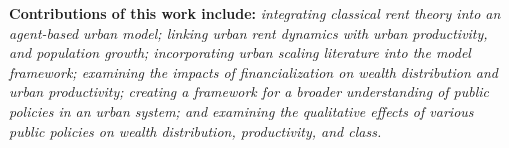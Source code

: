 \textbf{Contributions of this work include:} \textit{integrating classical rent theory into an agent-based urban model; linking urban rent dynamics with urban productivity, and population growth; incorporating urban scaling literature into the model framework; examining the impacts of financialization on wealth distribution and urban productivity; creating a framework for a broader understanding of public policies in an urban system; and examining the qualitative effects of various public policies on wealth distribution, productivity, and class.}



